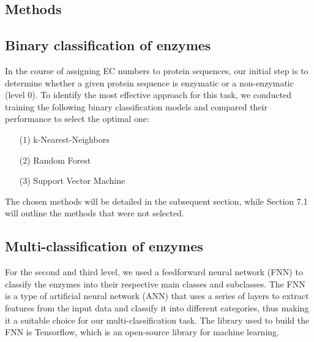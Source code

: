\documentclass{bioinfo}
\begin{document}
\begin{methods}
\section{Methods}
\subsection{Binary classification of enzymes}
In the course of assigning EC numbers to protein sequences,
our initial step is to determine whether a given protein sequence is enzymatic or a non-enzymatic (level 0).
To identify the most effective approach for this task,
we conducted training the following binary classification models and compared their performance to select the optimal one:
\begin{enumerate}
	\item[(1)] k-Nearest-Neighbors
	\item[(2)] Random Forest 
	\item[(3)] Support Vector Machine
\end{enumerate}

The chosen methods will be detailed in the subsequent section, while Section 7.1 will outline the methods that were not selected.


\subsection{Multi-classification of enzymes}
For the second and third level, we used a feedforward neural network (FNN) to classify the enzymes into their respective main classes and subclasses.
The FNN is a type of artificial neural network (ANN) that uses a series of layers to extract features from the input data and classify it into different categories,
thus making it a suitable choice for our multi-classification task. The library used to build the FNN is Tensorflow, which is an open-source library for machine learning.


\end{methods}
\end{document}
